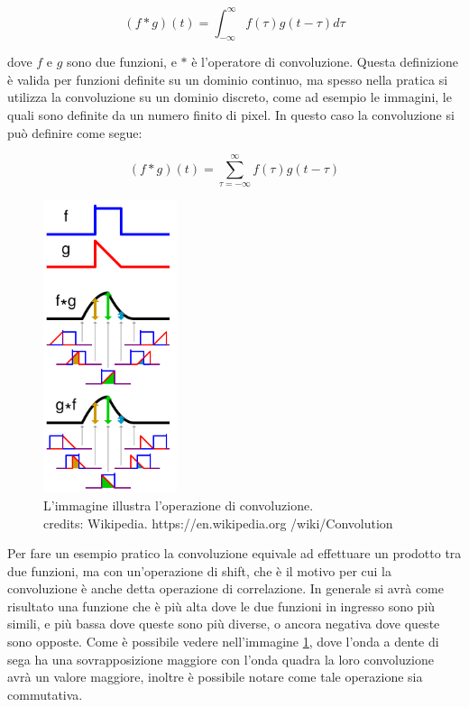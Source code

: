 \begin{equation}
    \label{eq:convolution}
    (f * g)(t) = \int_{-\infty}^{\infty} f(\tau)g(t-\tau)d\tau
\end{equation}

dove $f$ e $g$ sono due funzioni, e $*$ è l'operatore di convoluzione. Questa definizione è valida per funzioni definite su un dominio
continuo, ma spesso nella pratica si utilizza la convoluzione su un dominio discreto, come ad esempio le immagini, le quali sono 
definite da un numero finito di pixel. In questo caso la convoluzione si può definire come segue:

\begin{equation}
    \label{eq:convolution_discrete}
    (f * g)(t) = \sum_{\tau=-\infty}^{\infty} f(\tau)g(t-\tau)
\end{equation}

\vspace{2cm}
\begin{figure}
    \centering
    \hspace{0cm}
    \includegraphics[width=0.35\textwidth]{imgs/Comparison_convolution_correlation.png}
    \caption{L'immagine illustra l'operazione di convoluzione.\\
    credits: Wikipedia. https://en.wikipedia.org /wiki/Convolution}
    \label{fig:convolution_example}
\end{figure}

Per fare un esempio pratico la convoluzione equivale ad effettuare un prodotto tra due funzioni, ma con un'operazione di shift, che è il motivo per cui
la convoluzione è anche detta operazione di correlazione. In generale si avrà come risultato una funzione che è più alta dove le due funzioni
in ingresso sono più simili, e più bassa dove queste sono più diverse, o ancora negativa dove queste sono opposte.
Come è possibile vedere nell'immagine \ref{fig:convolution_example}, dove l'onda a dente di sega ha una sovrapposizione maggiore con l'onda quadra
la loro convoluzione avrà un valore maggiore, inoltre è possibile notare come tale operazione sia commutativa.

